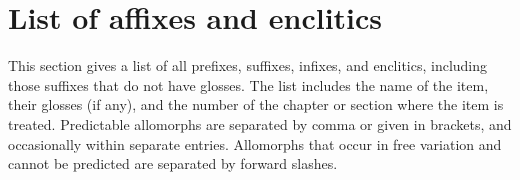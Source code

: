 \chapter{List of affixes and enclitics}
\label{apx:appendix}



\label{apx:List of affixes and enclitics}

This section gives a list of all prefixes, suffixes, infixes, and enclitics, including those suffixes that do not have glosses. The list includes the name of the item, their glosses (if any), and the number of the chapter or section where the item is treated. Predictable allomorphs are separated by comma or given in brackets, and occasionally within separate entries. Allomorphs that occur in free variation and cannot be predicted are separated by forward slashes.
 

